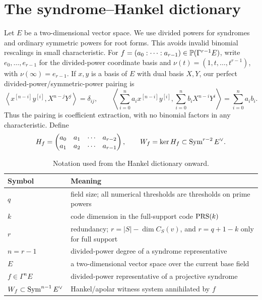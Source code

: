 \section{The syndrome--Hankel dictionary}\label{sec:dictionary}

Let $E$ be a two-dimensional vector space.  We use divided powers for
syndromes and ordinary symmetric powers for root forms.  This avoids
invalid binomial rescalings in small characteristic.  For
$f=(a_0:\cdots:a_{r-1})\in\mathbb P(\Gamma^{r-1}E)$, write
$e_0,\ldots,e_{r-1}$ for the divided-power coordinate basis and
$\nu(t)=(1,t,\ldots,t^{r-1})$, with
$\nu(\infty)=e_{r-1}$.  If \(x,y\) is a basis of \(E\) with dual
basis \(X,Y\), our perfect divided-power/symmetric-power pairing is
\[
 \left\langle x^{[n-i]}y^{[i]},X^{n-j}Y^j\right\rangle=\delta_{ij},
 \qquad
 \left\langle\sum_{i=0}^n a_i x^{[n-i]}y^{[i]},
                    \sum_{i=0}^n b_i X^{n-i}Y^i\right\rangle
       =\sum_{i=0}^n a_i b_i .
\]
Thus the pairing is coefficient extraction, with no binomial factors
in any characteristic.  Define
\[
 H_f=
 \begin{pmatrix}
 a_0&a_1&\cdots&a_{r-2}\\
 a_1&a_2&\cdots&a_{r-1}
 \end{pmatrix},\qquad
 W_f=\ker H_f\subset\operatorname{Sym}^{r-2}E^\vee.
\]

\begin{table}[H]
\centering
\small
\caption{Notation used from the Hankel dictionary onward.}
\label{tab:notation}
\begin{tabular}{p{}p{}}
\toprule
Symbol & Meaning\\
\midrule
$q$ & field size; all numerical thresholds are thresholds on prime powers\\
$k$ & code dimension in the full-support code $\operatorname{PRS}(k)$\\
$r$ & redundancy; $r=|S|-\dim C_S(v)$, and $r=q+1-k$ only for full support\\
$n=r-1$ & divided-power degree of a syndrome representative\\
$E$ & a two-dimensional vector space over the current base field\\
$f\in\Gamma^nE$ & divided-power representative of a projective syndrome\\
$W_f\subset\operatorname{Sym}^{n-1}E^\vee$ & Hankel/apolar witness system annihilated by $f$\\
\bottomrule
\end{tabular}
\end{table}

